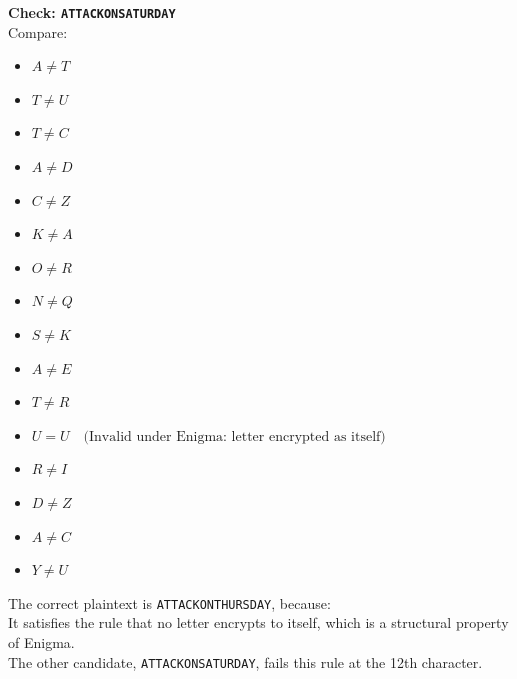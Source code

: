 \documentclass[12pt]{article}
\begin{document}
\textbf{Check: \texttt{ATTACKONSATURDAY}} \\
Compare:
\begin{itemize}
    \item \( A \neq T \)
    \item \( T \neq U \)
    \item \( T \neq C \)
    \item \( A \neq D \)
    \item \( C \neq Z \)
    \item \( K \neq A \)
    \item \( O \neq R \)
    \item \( N \neq Q \)
    \item \( S \neq K \)
    \item \( A \neq E \)
    \item \( T \neq R \)
    \item \( U = U \quad \text{(Invalid under Enigma: letter encrypted as itself)} \)
    \item \( R \neq I \)
    \item \( D \neq Z \)
    \item \( A \neq C \)
    \item \( Y \neq U \)
\end{itemize}

The correct plaintext is \texttt{ATTACKONTHURSDAY}, because: \\
It satisfies the rule that no letter encrypts to itself, which is a structural property of Enigma. \\
The other candidate, \texttt{ATTACKONSATURDAY}, fails this rule at the 12th character.
\end{document}
